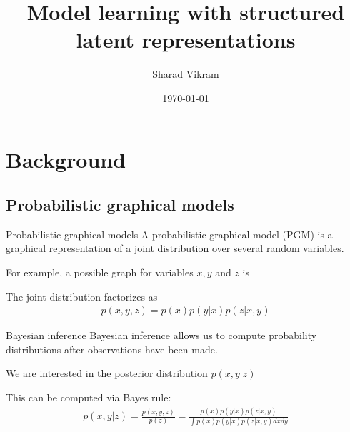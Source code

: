 \documentclass[10pt, compress]{beamer}
\title{Model learning with structured latent representations}
\subtitle{}
\date{\today}
\author{Sharad Vikram}
\institute{UCSD}
\begin{document}
\begin{frame}
	\titlepage
\end{frame}

\section{Background}

\subsection{Probabilistic graphical models}






\begin{frame}{Probabilistic graphical models}
	A probabilistic graphical model (PGM)
	is a graphical representation of a joint distribution
	over several random variables.
	\pause

	For example, a possible graph for variables $x, y$ and $z$ is
	\begin{center}
		
	\end{center}
	\pause
	The joint distribution factorizes as
	\begin{align*}
		p(x, y, z) = p(x)p(y | x)p(z | x, y)
	\end{align*}
\end{frame}

\begin{frame}{Bayesian inference}
	Bayesian inference allows us to
	compute probability distributions
	after observations have been made.

	\pause

	\begin{center}
		
	\end{center}
	\pause
	We are interested in the posterior distribution $p(x, y | z)$

	\pause
	This can be computed via Bayes rule:
	\begin{align*}
		p(x, y | z) = \frac{p(x, y, z)}{p(z)} = \frac{p(x)p(y | x)p(z | x, y)}{\int p(x)p(y | x)p(z | x, y)dx dy}
	\end{align*}
\end{frame}
\end{document}
